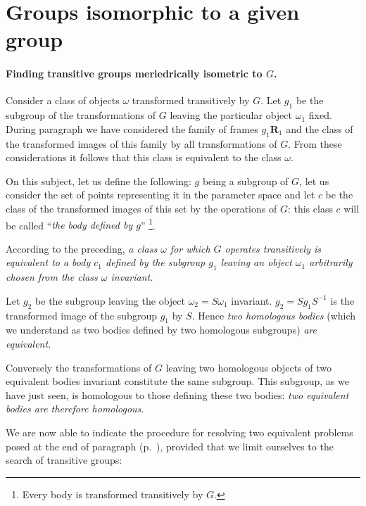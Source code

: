 \section{Groups isomorphic to a given group}
\label{sec:groups-isom-given}

\paragraph{Finding transitive groups meriedrically isometric to $G$.}
\label{sec:95}
Consider a class of objects $\omega$ transformed transitively by $G$. Let $g_{1}$ be the subgroup of the transformations of $G$ leaving the particular object $\omega_{1}$ fixed. During paragraph  we have considered the family of frames $g_{1}\mathbf{R}_{1}$ and the class of the transformed images of this family by all transformations of $G$. From these considerations it follows that this class is equivalent to the class $\omega$.

On this subject, let us define the following: $g$ being a subgroup of $G$, let us consider the set of points representing it in the parameter space and let $c$ be the class of the transformed images of this set by the operations of $G$: this class $c$ will be called ``\emph{the body defined by $g$}'' \footnote{Every body is transformed transitively by $G$.}.

According to the preceding, \emph{a class $\omega$ for which $G$ operates transitively is equivalent to a body $c_{1}$ defined by the subgroup $g_{1}$ leaving an object $\omega_{1}$ arbitrarily chosen from the class $\omega$ invariant.}

Let $g_{2}$ be the subgroup leaving the object $\omega_{2}=S\omega_{1}$ invariant. $g_{2}=Sg_{1}S^{-1}$ is the transformed image of the subgroup $g_{1}$ by $S$. Hence \emph{two homologous bodies} (which we understand as two bodies defined by two homologous subgroups) \emph{are equivalent.}

Conversely the transformations of $G$ leaving two homologous objects of two equivalent bodies invariant constitute the same subgroup. This subgroup, as we have just seen, is homologous to those defining these two bodies: \emph{two equivalent bodies are therefore homologous.}

We are now able to indicate the procedure for resolving two equivalent problems posed at the end of paragraph  (p.~\pageref{sec:91}), provided that we limit ourselves to the search of transitive groups:

\somespace

